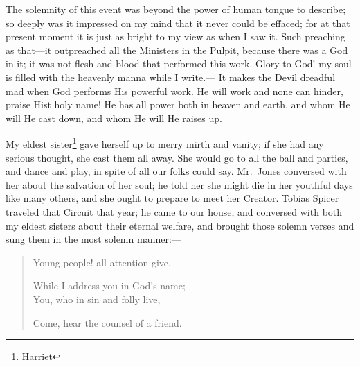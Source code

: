 The solemnity of this event was beyond the power of human tongue to describe; so deeply was it impressed on my mind that it never could be effaced; for at that present moment it is just as bright to my view as when I saw it.
Such preaching as that---it outpreached all the Ministers in the Pulpit, because there was a God in it; it was not flesh and blood that performed this work.
Glory to God! my soul is filled with the heavenly manna while I write.---
It makes the Devil dreadful mad when God performs His powerful work.
He will work and none can hinder, praise Hist holy name!
He has all power both in heaven and earth, and whom He will He cast down, and whom He will He raises up.

My eldest sister\footnote{Harriet} gave herself up to merry mirth and vanity; if she had any serious thought, she cast them all away.
She would go to all the ball and parties, and dance and play, in spite of all our folks could say.
Mr.\ Jones conversed with her about the salvation of her soul; he told her she might die in her youthful days like many others, and she ought to prepare to meet her Creator.
Tobias Spicer traveled that Circuit that year; he came to our house, and conversed with both my eldest sisters about their eternal welfare, and brought those solemn verses and sung them in the most solemn manner:---
\begin{quote}
\setlength{\parindent}{2ex}
    Young people! all attention give,
    \setlength{\parskip}{0pt}
    \par While I address you in God's name;\\
    You, who in sin and folly live,
    \par Come, hear the counsel of a friend.
\end{quote}

